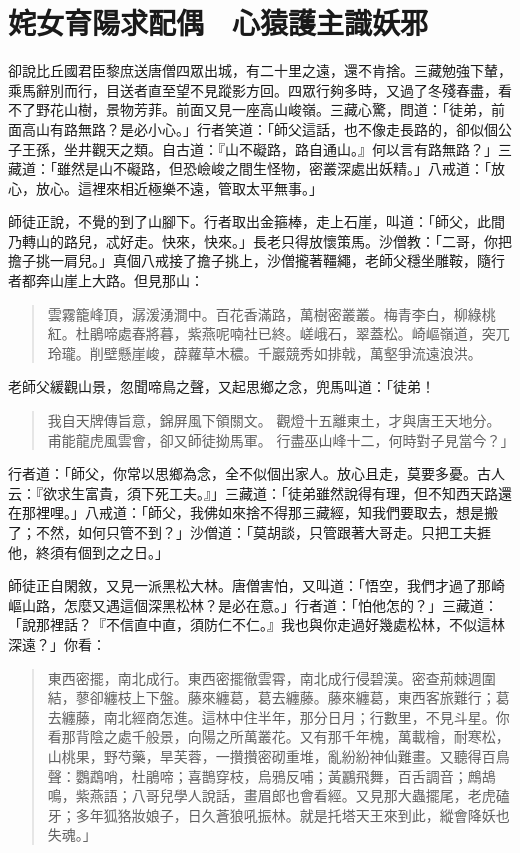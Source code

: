 
\chapter{姹女育陽求配偶　心猿護主識妖邪}

卻說比丘國君臣黎庶送唐僧四眾出城，有二十里之遠，還不肯捨。三藏勉強下輦，乘馬辭別而行，目送者直至望不見蹤影方回。四眾行夠多時，又過了冬殘春盡，看不了野花山樹，景物芳菲。前面又見一座高山峻嶺。三藏心驚，問道：「徒弟，前面高山有路無路？是必小心。」行者笑道：「師父這話，也不像走長路的，卻似個公子王孫，坐井觀天之類。自古道：『山不礙路，路自通山。』何以言有路無路？」三藏道：「雖然是山不礙路，但恐嶮峻之間生怪物，密叢深處出妖精。」八戒道：「放心，放心。這裡來相近極樂不遠，管取太平無事。」

師徒正說，不覺的到了山腳下。行者取出金箍棒，走上石崖，叫道：「師父，此間乃轉山的路兒，忒好走。快來，快來。」長老只得放懷策馬。沙僧教：「二哥，你把擔子挑一肩兒。」真個八戒接了擔子挑上，沙僧攏著韁繩，老師父穩坐雕鞍，隨行者都奔山崖上大路。但見那山：
\begin{quote}
雲霧籠峰頂，潺湲湧澗中。百花香滿路，萬樹密叢叢。梅青李白，柳綠桃紅。杜鵑啼處春將暮，紫燕呢喃社已終。嵯峨石，翠蓋松。崎嶇嶺道，突兀玲瓏。削壁懸崖峻，薜蘿草木穠。千巖競秀如排戟，萬壑爭流遠浪洪。
\end{quote}

老師父緩觀山景，忽聞啼鳥之聲，又起思鄉之念，兜馬叫道：「徒弟！
\begin{quote}
我自天牌傳旨意，錦屏風下領關文。
觀燈十五離東土，才與唐王天地分。
甫能龍虎風雲會，卻又師徒拗馬軍。
行盡巫山峰十二，何時對子見當今？」
\end{quote}

行者道：「師父，你常以思鄉為念，全不似個出家人。放心且走，莫要多憂。古人云：『欲求生富貴，須下死工夫。』」三藏道：「徒弟雖然說得有理，但不知西天路還在那裡哩。」八戒道：「師父，我佛如來捨不得那三藏經，知我們要取去，想是搬了；不然，如何只管不到？」沙僧道：「莫胡談，只管跟著大哥走。只把工夫捱他，終須有個到之之日。」

師徒正自閑敘，又見一派黑松大林。唐僧害怕，又叫道：「悟空，我們才過了那崎嶇山路，怎麼又遇這個深黑松林？是必在意。」行者道：「怕他怎的？」三藏道：「說那裡話？『不信直中直，須防仁不仁。』我也與你走過好幾處松林，不似這林深遠？」你看：
\begin{quote}
東西密擺，南北成行。東西密擺徹雲霄，南北成行侵碧漢。密查荊棘週圍結，蓼卻纏枝上下盤。藤來纏葛，葛去纏藤。藤來纏葛，東西客旅難行；葛去纏藤，南北經商怎進。這林中住半年，那分日月；行數里，不見斗星。你看那背陰之處千般景，向陽之所萬叢花。又有那千年槐，萬載檜，耐寒松，山桃果，野芍藥，旱芙蓉，一攢攢密砌重堆，亂紛紛神仙難畫。又聽得百鳥聲：鸚鵡哨，杜鵑啼；喜鵲穿枝，烏鴉反哺；黃鸝飛舞，百舌調音；鷓鴣鳴，紫燕語；八哥兒學人說話，畫眉郎也會看經。又見那大蟲擺尾，老虎磕牙；多年狐狢妝娘子，日久蒼狼吼振林。就是托塔天王來到此，縱會降妖也失魂。」
\end{quote}

